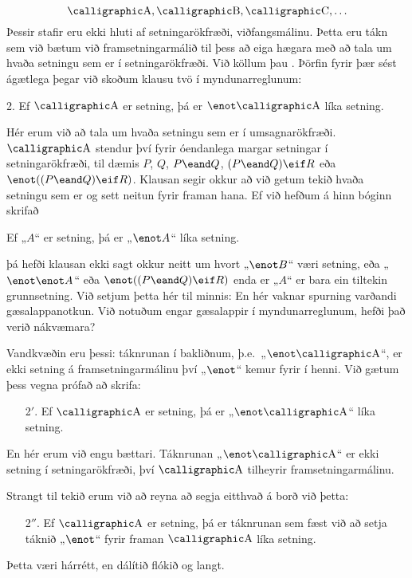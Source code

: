 	$$\meta{A}, \meta{B}, \meta{C}, \ldots$$
Þessir stafir eru ekki hluti af setningarökfræði, viðfangsmálinu. Þetta eru tákn sem við bætum við framsetningarmálið til þess að eiga hægara með að tala um hvaða setningu sem er í setningarökfræði. Við köllum þau . Þörfin fyrir þær sést ágætlega þegar við skoðum klausu tvö í myndunarreglunum:

	\begin{earg}
		\item[2.] Ef $\meta{A}$ er setning, þá er $\enot\meta{A}$ líka setning.
	\end{earg}
Hér erum við að tala um hvaða setningu sem er í umsagnarökfræði. $\meta{A}$ stendur því fyrir óendanlega margar setningar í setningarökfræði, til dæmis $P$, $Q$, $P \eand Q$, $(P \eand Q) \eif R$ eða $\enot((P \eand Q) \eif R)$. Klausan segir okkur að við getum tekið hvaða setningu sem er og sett neitun fyrir framan hana. Ef við hefðum á hinn bóginn skrifað
	\begin{ebullet}
		\item Ef „$A$“ er setning, þá er „$\enot A$“ líka setning.
	\end{ebullet}
þá hefði klausan ekki sagt okkur neitt um hvort „$\enot B$“ væri setning, eða „$\enot \enot A$“ eða $\enot((P \eand Q) \eif R)$ enda er „$A$“ er bara ein tiltekin grunnsetning. Við setjum þetta hér til minnis:
En hér vaknar spurning varðandi gæsalappanotkun. Við notuðum engar gæsalappir í myndunarreglunum, hefði það verið nákvæmara?		
		
Vandkvæðin eru þessi: táknrunan í bakliðnum, þ.e.\ „$\enot \meta{A}$“, er ekki setning á framsetningarmálinu því „$\enot$“ kemur fyrir í henni. Við gætum þess vegna prófað að skrifa:
	\begin{enumerate}
		\item[2$'$.] Ef $\meta{A}$ er setning, þá er „$\enot\meta{A}$“ líka setning.
	\end{enumerate}
En hér erum við engu bættari. Táknrunan „$\enot\meta{A}$“ er ekki setning í setningarökfræði, því $\meta{A}$ tilheyrir framsetningarmálinu.

Strangt til tekið erum við að reyna að segja eitthvað á borð við þetta:
	\begin{enumerate}
		\item[2$''$.] Ef $\meta{A}$ er setning, þá er táknrunan sem fæst við að setja táknið „$\enot$“ fyrir framan $\meta{A}$ líka setning.
	\end{enumerate}
Þetta væri hárrétt, en dálítið flókið og langt. 

